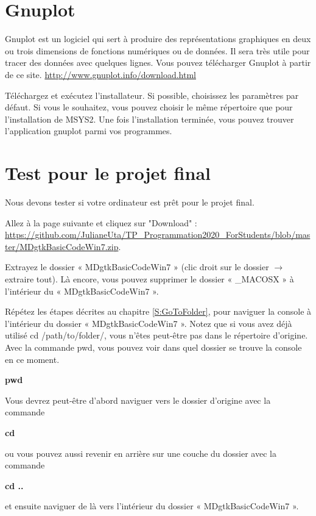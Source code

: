 \documentclass{article}
\begin{document}
\section{Gnuplot}
Gnuplot est un logiciel qui sert à produire des représentations graphiques en deux ou trois dimensions de fonctions numériques ou de données. Il sera très utile pour tracer des données avec quelques lignes. Vous pouvez télécharger Gnuplot à partir de ce site. \href{http://www.gnuplot.info/download.html}{http://www.gnuplot.info/download.html} 

Téléchargez et exécutez l'installateur. Si possible, choisissez les paramètres par défaut. Si vous le souhaitez, vous pouvez choisir le même répertoire que pour l'installation de MSYS2. Une fois l'installation terminée, vous pouvez trouver l'application gnuplot parmi vos programmes. 

\section{Test pour le projet final}
Nous devons tester si votre ordinateur est prêt pour le projet final.

Allez à la page suivante et cliquez sur "Download" : \\ \href{https://github.com/JulianeUta/TP_Programmation2020_ForStudents/blob/master/MDgtkBasicCodeWin7.zip}{https://github.com/JulianeUta/TP\_Programmation2020\_ForStudents/blob/master/MDgtkBasicCodeWin7.zip}.

Extrayez le dossier « MDgtkBasicCodeWin7 » (clic droit sur le dossier $\rightarrow$ extraire tout). Là encore, vous pouvez supprimer le dossier « \_MACOSX » à l'intérieur du « MDgtkBasicCodeWin7 ».

Répétez les étapes décrites au chapitre \ref{S:GoToFolder}, pour naviguer la console à l'intérieur du dossier « MDgtkBasicCodeWin7 ». Notez que si vous avez déjà utilisé cd /path/to/folder/, vous n'êtes peut-être pas dans le répertoire d'origine. Avec la commande pwd, vous pouvez voir dans quel dossier se trouve la console en ce moment.
\begin{tcolorbox}[width=\textwidth,colframe=MidnightBlue,colback={black},title={Ceci est la console MinGW-w64 Win64 Shell},outer arc=0mm,colupper=white]    
    \large\textbf{  pwd }
\end{tcolorbox}
Vous devrez peut-être d'abord naviguer vers le dossier d'origine avec la commande
\begin{tcolorbox}[width=\textwidth,colframe=MidnightBlue,colback={black},title={Ceci est la console MinGW-w64 Win64 Shell},outer arc=0mm,colupper=white]    
    \large\textbf{  cd }
\end{tcolorbox}
ou vous pouvez aussi revenir en arrière sur une couche du dossier avec la commande
\begin{tcolorbox}[width=\textwidth,colframe=MidnightBlue,colback={black},title={Ceci est la console MinGW-w64 Win64 Shell},outer arc=0mm,colupper=white]    
    \large\textbf{  cd ..}
\end{tcolorbox}
et ensuite naviguer de là vers l'intérieur du dossier « MDgtkBasicCodeWin7 ».
\end{document}
